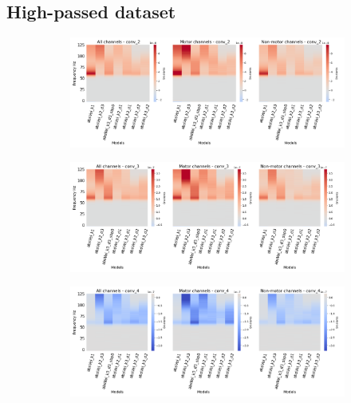 \subsection*{High-passed dataset}\label{subsec:absVel-high-passed-dataset-appendixD}
\begin{figure}[!htpb]
\centering
\begin{subfigure}[b]{\textwidth}
   \includegraphics[width=1\linewidth]{img/appendix/D/conv-2/hp-m/absVel_model_gradients_all_kinds}
   \caption{}
   \label{fig:absVel-pw-hp-grads-conv-2}
\end{subfigure}

\begin{subfigure}[b]{\textwidth}
   \includegraphics[width=1\linewidth]{img/appendix/D/conv-3/hp-m/absVel_model_gradients_all_kinds}
   \caption{}
   \label{fig:absVel-pw-hp-grads-conv-3}
\end{subfigure}

\begin{subfigure}[b]{\textwidth}
   \includegraphics[width=1\linewidth]{img/appendix/D/conv-4/hp-m/absVel_model_gradients_all_kinds}
   \caption{}
   \label{fig:absVel-pw-hp-grads-conv-4}
\end{subfigure}


\end{figure}
